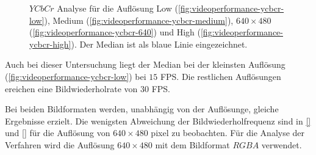 \begin{figure}[!ht]
	\centering
	\caption{$\mathit{YCbCr}$ Analyse für die Auflösung Low (\autoref{fig:videoperformance-ycbcr-low}),
	 Medium (\autoref{fig:videoperformance-ycbcr-medium}), $640 \times 480$ (\autoref{fig:videoperformance-ycbcr-640})
	 und High (\autoref{fig:videoperformance-ycbcr-high}). Der Median ist als blaue Linie eingezeichnet.}
	\label{fig:videoperformance-ycbcr}
\end{figure}
Auch bei dieser Untersuchung liegt der Median bei der kleinsten Auflösung (\autoref{fig:videoperformance-ycbcr-low})
 bei $15$ FPS. Die restlichen Auflösungen ereichen eine Bildwiederholrate von $30$ FPS.

Bei beiden Bildformaten werden, unabhängig von der Auflösunge, gleiche Ergebnisse erzielt. Die wenigsten Abweichung der
 Bildwiederholfrequenz sind in \autoref{} und \autoref{} für die Auflösung von $640 \times 480$ \gls{pixel} zu
 beobachten. Für die Analyse der Verfahren wird die Auflösung $640 \times 480$ mit dem Bildformat $\mathit{RGBA}$
 verwendet.

